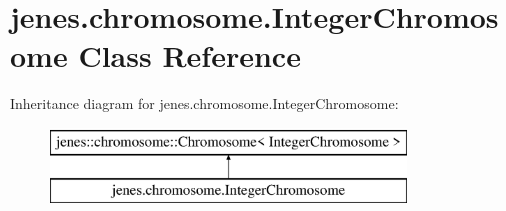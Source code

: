 \hypertarget{classjenes_1_1chromosome_1_1_integer_chromosome}{\section{jenes.\-chromosome.\-Integer\-Chromosome Class Reference}
\label{classjenes_1_1chromosome_1_1_integer_chromosome}
}
Inheritance diagram for jenes.\-chromosome.\-Integer\-Chromosome\-:\begin{figure}[H]
\begin{center}
\leavevmode
\includegraphics[height=2.000000cm]{classjenes_1_1chromosome_1_1_integer_chromosome}
\end{center}
\end{figure}
